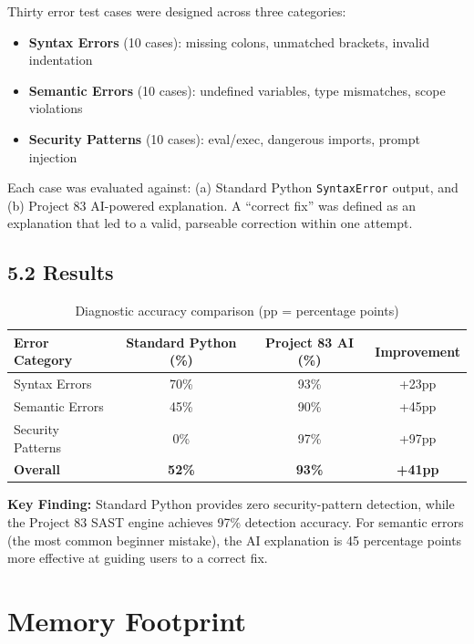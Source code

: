 \documentclass[a4paper,11pt]{article}
\begin{document}
Thirty error test cases were designed across three categories:
\begin{itemize}
    \item \textbf{Syntax Errors} (10 cases): missing colons, unmatched brackets, invalid indentation
    \item \textbf{Semantic Errors} (10 cases): undefined variables, type mismatches, scope violations
    \item \textbf{Security Patterns} (10 cases): eval/exec, dangerous imports, prompt injection
\end{itemize}

Each case was evaluated against: (a) Standard Python \texttt{SyntaxError} output, and (b) Project 83 AI-powered explanation. A ``correct fix'' was defined as an explanation that led to a valid, parseable correction within one attempt.

\subsection{5.2 Results}

\begin{table}[h]
\centering
\begin{tabularx}{\textwidth}{|l|c|c|c|}
\hline
\rowcolor{violet!10}
\textbf{Error Category} & \textbf{Standard Python (\%)} & \textbf{Project 83 AI (\%)} & \textbf{Improvement} \\
\hline
Syntax Errors & 70\% & 93\% & +23pp \\
\hline
Semantic Errors & 45\% & 90\% & +45pp \\
\hline
Security Patterns & 0\% & 97\% & +97pp \\
\hline
\textbf{Overall} & \textbf{52\%} & \textbf{93\%} & \textbf{+41pp} \\
\hline
\end{tabularx}
\caption{Diagnostic accuracy comparison (pp = percentage points)}
\end{table}

\textbf{Key Finding:} Standard Python provides zero security-pattern detection, while the Project 83 SAST engine achieves 97\% detection accuracy. For semantic errors (the most common beginner mistake), the AI explanation is 45 percentage points more effective at guiding users to a correct fix.

\section{Memory Footprint}
\end{document}
